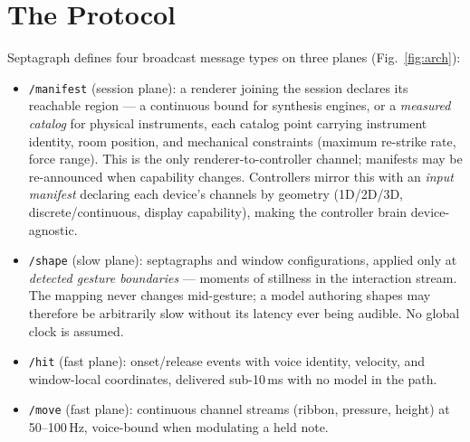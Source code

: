 \documentclass[10pt,twocolumn]{article}
\begin{document}
\section{The Protocol}
\label{sec:protocol}

Septagraph defines four broadcast message types on three planes
(Fig.~\ref{fig:arch}):

\begin{itemize}
\item \texttt{/manifest} (session plane): a renderer joining the
session declares its reachable region --- a continuous bound for
synthesis engines, or a \emph{measured catalog} for physical
instruments, each catalog point carrying instrument identity, room
position, and mechanical constraints (maximum re-strike rate, force
range). This is the only renderer-to-controller channel; manifests
may be re-announced when capability changes. Controllers mirror this
with an \emph{input manifest} declaring each device's channels by
geometry (1D/2D/3D, discrete/continuous, display capability), making
the controller brain device-agnostic.
\item \texttt{/shape} (slow plane): septagraphs and window
configurations, applied only at \emph{detected gesture boundaries} ---
moments of stillness in the interaction stream. The mapping never
changes mid-gesture; a model authoring shapes may therefore be
arbitrarily slow without its latency ever being audible. No global
clock is assumed.
\item \texttt{/hit} (fast plane): onset/release events with voice
identity, velocity, and window-local coordinates, delivered sub-10\,ms
with no model in the path.
\item \texttt{/move} (fast plane): continuous channel streams
(ribbon, pressure, height) at 50--100\,Hz, voice-bound when
modulating a held note.
\end{itemize}
\end{document}
